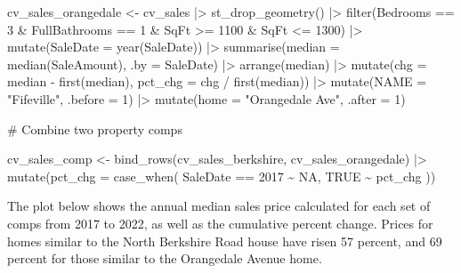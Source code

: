 \documentclass[
  letterpaper,
  DIV=11,
  numbers=noendperiod]{scrartcl}
\newenvironment{Shaded}{\begin{snugshade}}{\end{snugshade}}
\newcommand{\AttributeTok}[1]{\textcolor[rgb]{0.40,0.45,0.13}{#1}}
\newcommand{\CommentTok}[1]{\textcolor[rgb]{0.37,0.37,0.37}{#1}}
\newcommand{\ConstantTok}[1]{\textcolor[rgb]{0.56,0.35,0.01}{#1}}
\newcommand{\DecValTok}[1]{\textcolor[rgb]{0.68,0.00,0.00}{#1}}
\newcommand{\FunctionTok}[1]{\textcolor[rgb]{0.28,0.35,0.67}{#1}}
\newcommand{\NormalTok}[1]{\textcolor[rgb]{0.00,0.23,0.31}{#1}}
\newcommand{\OtherTok}[1]{\textcolor[rgb]{0.00,0.23,0.31}{#1}}
\newcommand{\SpecialCharTok}[1]{\textcolor[rgb]{0.37,0.37,0.37}{#1}}
\newcommand{\StringTok}[1]{\textcolor[rgb]{0.13,0.47,0.30}{#1}}
\begin{document}
\begin{Shaded}
\begin{Highlighting}[]
\NormalTok{cv\_sales\_orangedale }\OtherTok{\textless{}{-}}\NormalTok{ cv\_sales }\SpecialCharTok{|\textgreater{}} 
  \FunctionTok{st\_drop\_geometry}\NormalTok{() }\SpecialCharTok{|\textgreater{}} 
  \FunctionTok{filter}\NormalTok{(Bedrooms }\SpecialCharTok{==} \DecValTok{3} \SpecialCharTok{\&}\NormalTok{ FullBathrooms }\SpecialCharTok{==} \DecValTok{1} \SpecialCharTok{\&}
\NormalTok{           SqFt }\SpecialCharTok{\textgreater{}=} \DecValTok{1100} \SpecialCharTok{\&}\NormalTok{ SqFt }\SpecialCharTok{\textless{}=} \DecValTok{1300}\NormalTok{) }\SpecialCharTok{|\textgreater{}} 
  \FunctionTok{mutate}\NormalTok{(}\AttributeTok{SaleDate =} \FunctionTok{year}\NormalTok{(SaleDate)) }\SpecialCharTok{|\textgreater{}} 
  \FunctionTok{summarise}\NormalTok{(}\AttributeTok{median =} \FunctionTok{median}\NormalTok{(SaleAmount), }\AttributeTok{.by =}\NormalTok{ SaleDate) }\SpecialCharTok{|\textgreater{}} 
  \FunctionTok{arrange}\NormalTok{(median) }\SpecialCharTok{|\textgreater{}} 
  \FunctionTok{mutate}\NormalTok{(}\AttributeTok{chg =}\NormalTok{ median }\SpecialCharTok{{-}} \FunctionTok{first}\NormalTok{(median),}
         \AttributeTok{pct\_chg =}\NormalTok{ chg }\SpecialCharTok{/} \FunctionTok{first}\NormalTok{(median)) }\SpecialCharTok{|\textgreater{}} 
  \FunctionTok{mutate}\NormalTok{(}\AttributeTok{NAME =} \StringTok{"Fifeville"}\NormalTok{, }\AttributeTok{.before =} \DecValTok{1}\NormalTok{) }\SpecialCharTok{|\textgreater{}} 
  \FunctionTok{mutate}\NormalTok{(}\AttributeTok{home =} \StringTok{"Orangedale Ave"}\NormalTok{, }\AttributeTok{.after =} \DecValTok{1}\NormalTok{)}

\CommentTok{\# Combine two property comps}

\NormalTok{cv\_sales\_comp }\OtherTok{\textless{}{-}} \FunctionTok{bind\_rows}\NormalTok{(cv\_sales\_berkshire, cv\_sales\_orangedale) }\SpecialCharTok{|\textgreater{}} 
  \FunctionTok{mutate}\NormalTok{(}\AttributeTok{pct\_chg =} \FunctionTok{case\_when}\NormalTok{(}
\NormalTok{    SaleDate }\SpecialCharTok{==} \DecValTok{2017} \SpecialCharTok{\textasciitilde{}} \ConstantTok{NA}\NormalTok{,}
    \ConstantTok{TRUE} \SpecialCharTok{\textasciitilde{}}\NormalTok{ pct\_chg}
\NormalTok{  ))}
\end{Highlighting}
\end{Shaded}

The plot below shows the annual median sales price calculated for each
set of comps from 2017 to 2022, as well as the cumulative percent
change. Prices for homes similar to the North Berkshire Road house have
risen 57 percent, and 69 percent for those similar to the Orangedale
Avenue home.
\end{document}
